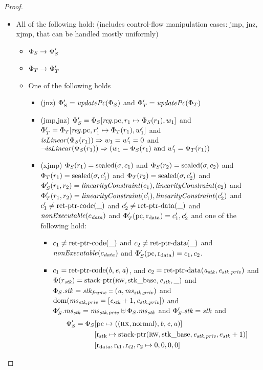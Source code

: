 \begin{proof}
\begin{itemize}
\item All of the following hold: (includes control-flow manipulation cases: jmp, jnz, xjmp, that can be handled mostly uniformly)
  \begin{itemize}
  \item $\Phi_S \rightarrow^{} \Phi_S'$
  \item $\Phi_T \rightarrow^{} \Phi_T'$
  \item One of the following holds
    \begin{itemize}
    \item(jnz) $\Phi_S' = \updPcAddr{\Phi_S}$ and $\Phi_T' = \updPcAddr{\Phi_T}$
    \item(jmp,jnz) $\Phi_S' = \Phi_S[\mathit{reg}.\mathrm{pc},r_1 \mapsto \Phi_S(r_1),w_1]$ and $\Phi_T' =
      \Phi_T[\mathit{reg}.\mathrm{pc},r_1' \mapsto \Phi_T(r_1),w_1']$ and 
      $\isLinear{\Phi_S(r_1)} \Rightarrow w_1 = w_1' = 0$ and
      $\neg \isLinear{\Phi_S(r_1)} \Rightarrow (w_1 = \Phi_S(r_1) \text{ and }
      w_1' = \Phi_T(r_1))$
    \item(xjmp) $\Phi_S(r_1) = \mathrm{sealed}(\sigma,c_1)$ and $\Phi_S(r_2) =
      \mathrm{sealed}(\sigma,c_2)$ and $\Phi_T(r_1) = \mathrm{sealed}(\sigma,c_1')$ and
      $\Phi_T(r_2) = \mathrm{sealed}(\sigma,c_2')$ and $\Phi_S'(r_1,r_2) =
      \linCons{c_1},\linCons{c_2}$ and $\Phi_T'(r_1,r_2) =
      \linCons{c_1'},\linCons{c_2'}$ and\\
      $c_1' \neq \mathrm{ret\text{-}ptr\text{-}code}(\_)$ and $c_2' \neq \mathrm{ret\text{-}ptr\text{-}data}(\_)$ and
        $\nonExec{c_\data}$ and $\Phi_T'(\mathrm{pc},\mathrm{r}_\mathrm{data}) = c_1',c_2'$ and
      one of the following hold:
      \begin{itemize}
      \item $c_1 \neq \mathrm{ret\text{-}ptr\text{-}code}(\_)$ and $c_2 \neq \mathrm{ret\text{-}ptr\text{-}data}(\_)$ and
        $\nonExec{c_\data}$ and $\Phi_S'(\mathrm{pc},\mathrm{r}_\mathrm{data}) = c_1,c_2$.
      \item $c_1 = \mathrm{ret\text{-}ptr\text{-}code}(\mathit{b},\mathit{e},\mathit{a})$, and $c_2 =
        \mathrm{ret\text{-}ptr\text{-}data}(\mathit{a}_{\mathit{stk}},\mathit{e}_{\mathit{stk},\mathit{priv}})$ and $\Phi(r_{\mathit{stk}}) =
        \mathrm{stack\text{-}ptr}(\textsc{rw},\mathrm{stk\_base},\mathit{e}_{\mathit{stk}},\_)$ and $\Phi_S.\mathit{stk} = \mathit{stk}_{\mathit{frame}}
        :: (\mathit{a},\mathit{ms}_{\mathit{stk},\mathit{priv}})$ and
        $\mathrm{dom}(\mathit{ms}_{\mathit{stk},\mathit{priv}} = [\mathit{e}_{\mathit{stk}}+1,\mathit{e}_{\mathit{stk},\mathit{priv}}])$ and
        $\Phi_S'.\mathit{ms}_{\mathit{stk}} = \mathit{ms}_{\mathit{stk},\mathit{priv}} \uplus \Phi_S.\mathit{ms}_{\mathit{stk}}$ and
        $\Phi_S'.\mathit{stk} = \mathit{stk}$ and
        \[
          \begin{split}
\Phi_S' = \Phi_S&[\mathrm{pc} \mapsto ((\textsc{rx},\mathrm{normal}),\mathit{b},\mathit{e},\mathit{a})]\\
            &[\mathrm{r}_\mathrm{stk} \mapsto
            \mathrm{stack\text{-}ptr}(\textsc{rw},\mathrm{stk\_base},\mathit{e}_{\mathit{stk},\mathit{priv}},e_{\mathit{stk}}+1)] \\
            &[\mathrm{r}_\mathrm{data},\mathrm{r}_\mathrm{t1},\mathrm{r}_\mathrm{t2},r_2 \mapsto 0, 0, 0, 0]
          \end{split}
        \]
      \end{itemize}
    \end{itemize}
  \end{itemize}
\end{itemize}
\end{proof}

